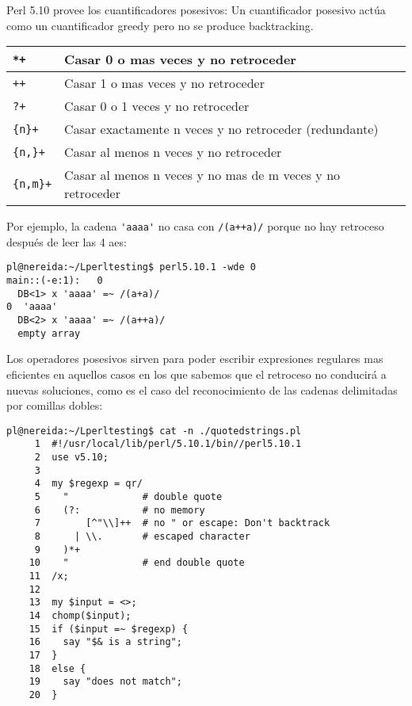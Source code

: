 Perl 5.10 provee los cuantificadores posesivos:
Un cuantificador posesivo actúa como un cuantificador greedy
pero no se produce backtracking.

\begin{tabular}{|p{2cm}|l}
\hline
    \verb|*+| &     Casar 0 o mas veces y no retroceder\\
\hline
    \verb|++| &     Casar 1 o mas veces y no retroceder\\
\hline
    \verb|?+| &     Casar 0 o 1 veces y no retroceder\\
\hline
    \verb|{n}+| &   Casar exactamente n veces y no retroceder (redundante)\\
\hline
    \verb|{n,}+| &  Casar al menos n veces y no retroceder\\
\hline
    \verb|{n,m}+| & Casar al menos n veces y no mas de m veces y no retroceder\\
\hline
\end{tabular}
Por ejemplo, la cadena \verb|'aaaa'| no casa con \verb|/(a++a)/| porque no 
hay retroceso después de leer las 4 aes:
\begin{verbatim}
pl@nereida:~/Lperltesting$ perl5.10.1 -wde 0
main::(-e:1):   0
  DB<1> x 'aaaa' =~ /(a+a)/
0  'aaaa'
  DB<2> x 'aaaa' =~ /(a++a)/
  empty array
\end{verbatim}


Los operadores posesivos sirven para poder escribir expresiones regulares mas eficientes
en aquellos casos en los que sabemos que el retroceso no conducirá a nuevas soluciones, como
es el caso del reconocimiento de las cadenas delimitadas por 
comillas dobles:

\begin{verbatim}
pl@nereida:~/Lperltesting$ cat -n ./quotedstrings.pl
     1  #!/usr/local/lib/perl/5.10.1/bin//perl5.10.1
     2  use v5.10;
     3
     4  my $regexp = qr/
     5    "             # double quote
     6    (?:           # no memory
     7        [^"\\]++  # no " or escape: Don't backtrack
     8      | \\.       # escaped character
     9    )*+
    10    "             # end double quote
    11  /x;
    12
    13  my $input = <>;
    14  chomp($input);
    15  if ($input =~ $regexp) {
    16    say "$& is a string";
    17  }
    18  else {
    19    say "does not match";
    20  }
\end{verbatim}

